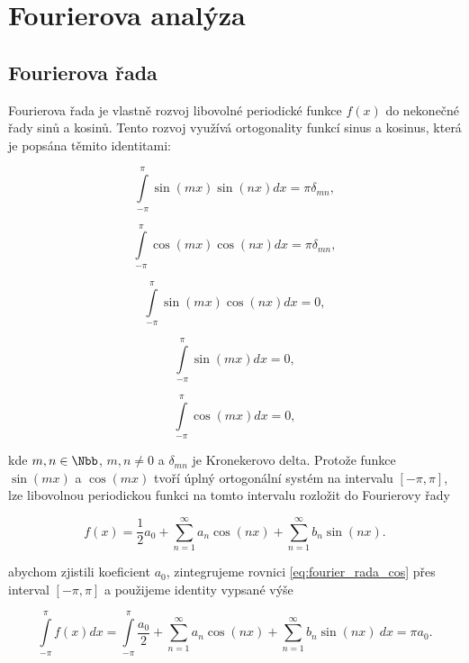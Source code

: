 \chapter{Fourierova analýza}
\setcounter{page}{1}


\section{Fourierova řada}

Fourierova řada je vlastně rozvoj libovolné periodické funkce $f(x)$ do nekonečné řady sinů a kosinů. Tento rozvoj využívá ortogonality funkcí sinus a kosinus, která je popsána těmito identitami:

\begin{equation}
\int\limits_{-\pi}^{\pi} \sin(mx) \sin(nx) dx = \pi \delta_{mn},
\end{equation}

\begin{equation}
\int\limits_{-\pi}^{\pi} \cos(mx) \cos(nx) dx = \pi \delta_{mn},
\end{equation}

\begin{equation}
\int\limits_{-\pi}^{\pi} \sin(mx) \cos(nx) dx = 0,
\end{equation}

\begin{equation}
\int\limits_{-\pi}^{\pi} \sin(mx) dx = 0,
\end{equation}

\begin{equation}
\int\limits_{-\pi}^{\pi} \cos(mx) dx = 0,
\end{equation}

kde $m,n \in \Nbb$, $m,n \neq 0$ a $\delta_{mn}$ je Kronekerovo delta. Protože funkce $\sin(mx)$ a $\cos(mx)$ tvoří úplný ortogonální systém na intervalu $[-\pi,\pi]$, lze libovolnou periodickou funkci na tomto intervalu rozložit do Fourierovy řady

\begin{equation} \label{eq:fourier_rada_cos}
f(x) = \frac{1}{2}a_0 + \sum\limits_{n=1}^{\infty} a_n \cos(nx) + \sum\limits_{n=1}^{\infty} b_n \sin(nx).
\end{equation}

abychom zjistili koeficient $a_0$, zintegrujeme rovnici \eqref{eq:fourier_rada_cos} přes interval $[-\pi,\pi]$ a použijeme identity vypsané výše

\begin{equation}
\int\limits_{-\pi}^{\pi} f(x) dx  = \int\limits_{-\pi}^{\pi} \frac{a_0}{2} + \sum\limits_{n=1}^{\infty} a_n \cos(nx) + \sum\limits_{n=1}^{\infty} b_n \sin(nx) ~ dx = \pi a_0.
\end{equation}

